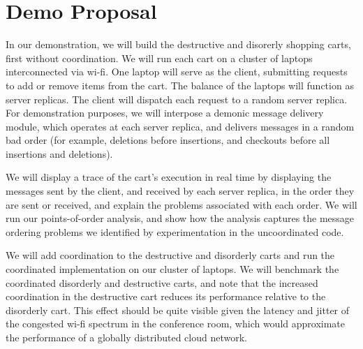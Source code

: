 \clearpage
\section{Demo Proposal}
\label{sec:demo}

In our demonstration, we will build the destructive and disorerly shopping
carts, first without coordination.  We will run each cart on a cluster of
laptops interconnected via wi-fi.  One laptop will serve as the client,
submitting requests to add or remove items from the cart.  The balance of the
laptops will function as server replicas.  The client will dispatch each
request to a random server replica.  For demonstration purposes, we will
interpose a demonic message delivery module, which operates at each server
replica, and delivers messages in a random bad order (for example, deletions
before insertions, and checkouts before all insertions and deletions).

We will display a trace of the cart's execution in real time by displaying the
messages sent by the client, and received by each server replica, in the order
they are sent or received, and explain the problems associated with each order.
We will run our points-of-order analysis, and show how the analysis captures
the message ordering problems we identified by experimentation in the
uncoordinated code.

We will add coordination to the destructive and disorderly carts and run the
coordinated implementation on our cluster of laptops.  We will benchmark the
coordinated disorderly and destructive carts, and note that the increased
coordination in the destructive cart reduces its performance relative to the
disorderly cart.  This effect should be quite visible given the latency and
jitter of the congested wi-fi spectrum in the conference room, which would
approximate the performance of a globally distributed cloud network.
